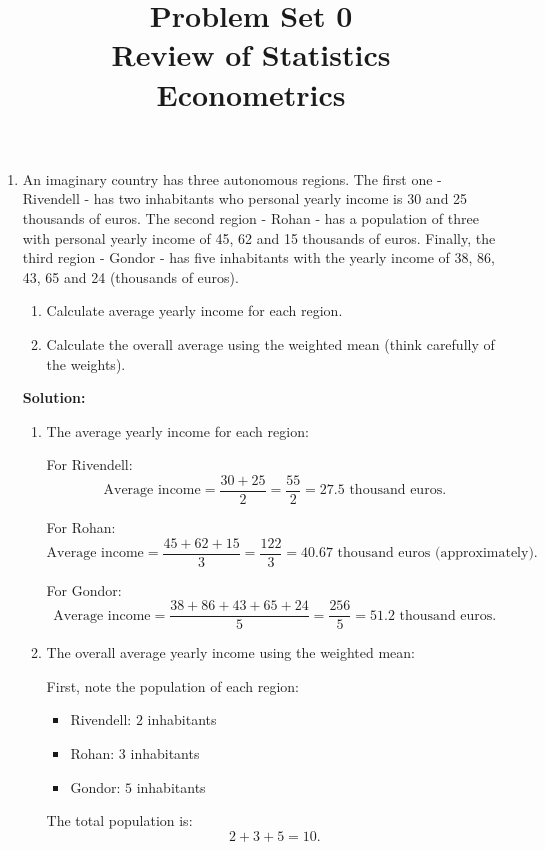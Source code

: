 \documentclass[12pt]{article}
\author{\empty}
\title{Problem Set 0\\Review of Statistics\\Econometrics}
\date{\empty}
\begin{document}
	\maketitle
	
\begin{enumerate}
	
\item An imaginary country has three autonomous regions. The first one - Rivendell - has two inhabitants who personal yearly income is 30 and 25 thousands of euros. The second region - Rohan - has a population of three with personal yearly income of 45, 62 and 15 thousands of euros. Finally, the third region - Gondor - has five inhabitants with the yearly income of  38, 86, 43, 65 and 24 (thousands of euros).

 
\begin{enumerate}
\item Calculate average yearly income for each region.
\item  Calculate the overall average using the weighted mean (think carefully of the weights).
\end{enumerate}

{\color{blue}
\noindent \textbf{Solution:}

\begin{enumerate}
\item The average yearly income for each region:

For Rivendell:
\[
\text{Average income} = \frac{30 + 25}{2} = \frac{55}{2} = 27.5 \text{ thousand euros}.
\]

For Rohan:
\[
\text{Average income} = \frac{45 + 62 + 15}{3} = \frac{122}{3} = 40.67 \text{ thousand euros (approximately)}.
\]

For Gondor:
\[
\text{Average income} = \frac{38 + 86 + 43 + 65 + 24}{5} = \frac{256}{5} = 51.2 \text{ thousand euros}.
\]

\item The overall average yearly income using the weighted mean:

First, note the population of each region:
\begin{itemize}
    \item Rivendell: \(2\) inhabitants
    \item Rohan: \(3\) inhabitants
    \item Gondor: \(5\) inhabitants
\end{itemize}

The total population is:
\[
2 + 3 + 5 = 10.
\]


\end{enumerate}}
\end{enumerate}
\end{document}
